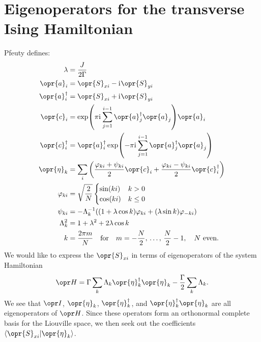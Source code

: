 \documentclass[../thesis.tex]{subfiles}
\begin{document}
\section{Eigenoperators for the transverse Ising Hamiltonian}

Pfeuty defines:
\begin{align}
  \lambda
  &= \frac{J}{2\Gamma}
  \label{eq:pflambda} \\
  \opr{a}_i
  &= \opr{S}_{xi} - \im\opr{S}_{yi} 
  \label{eq:pfa} \\
  \opr{a}_i^\dag
  &= \opr{S}_{xi} + \im\opr{S}_{yi} 
  \label{eq:pfadag} \\
  \opr{c}_i
  &= \exp(\pi\im\sum_{j=1}^{i-1} \opr{a}_j^\dag\opr{a}_j)\opr{a}_i
  \label{eq:pfc} \\
  \opr{c}_i^\dag
  &= \opr{a}_i^\dag\exp(-\pi\im\sum_{j=1}^{i-1} \opr{a}_j^\dag\opr{a}_j)
  \label{eq:pfcdag} \\
  \opr{\eta}_k
  &= \sum_i \qty(\frac{\varphi_{ki} + \psi_{ki}}{2}\opr{c}_i
  + \frac{\varphi_{ki} - \psi_{ki}}{2}\opr{c}_i^\dag)
  \label{eq:pfeta} \\
  \varphi_{ki}
  &= \sqrt{\frac{2}{N}}\begin{cases}
    \sin(ki) & k > 0 \\
    \cos(ki) & k \leq 0
  \end{cases}
  \label{eq:pfphi} \\
  \psi_{ki}
  &= -\Lambda_k^{-1} \qty((1 + \lambda\cos k)\varphi_{ki}
  + (\lambda\sin k)\varphi_{-ki})
  \label{eq:pfpsi} \\
  \Lambda_k^2
  &= 1 + \lambda^2 + 2\lambda\cos k
  \label{eq:pfLambda} \\
  k
  &= \frac{2\pi m}{N} \qfor m = -\frac{N}{2},\, \ldots,\, \frac{N}{2} - 1,
  \qq{$N$ even.}
  \label{eq:pfk}
\end{align}
We would like to express the $\opr{S}_{xi}$ in terms of eigenoperators of the
system Hamiltonian
\begin{equation}
  \ham
  = \Gamma\sum_k \Lambda_k \opr{\eta}_k^\dag\opr{\eta}_k
  - \frac{\Gamma}{2}\sum_k \Lambda_k.
  \label{eq:pfH}
\end{equation}
We see that $\idopr$, $\opr{\eta}_k$, $\opr{\eta}_k^\dag$, and
$\opr{\eta}_k^\dag\opr{\eta}_k$ are all eigenoperators of $\ham$. Since these
operators form an orthonormal complete basis for the Liouville space, we then
seek out the coefficients $\ip{\opr{S}_{xi}}{\opr{\eta}_k}$.
\end{document}

